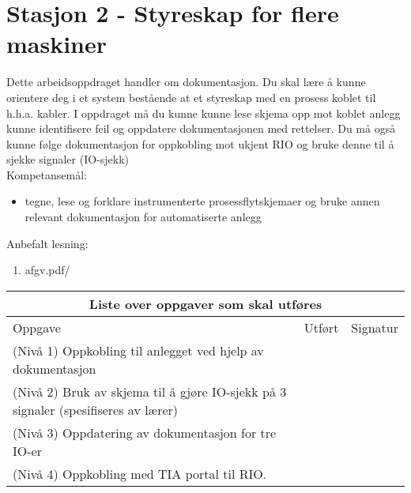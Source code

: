 
\noindent
\section*{Stasjon 2 - Styreskap for flere maskiner}

\vskip 5pt
Dette arbeidsoppdraget handler om dokumentasjon. Du skal lære å kunne orientere deg i et system bestående at et styreskap med en prosess koblet til h.h.a. kabler. I oppdraget må du kunne kunne lese skjema opp mot koblet anlegg kunne identifisere feil og oppdatere dokumentasjonen med rettelser. Du må også kunne følge dokumentasjon for oppkobling mot ukjent RIO og bruke denne til å sjekke signaler (IO-sjekk)\\

\vskip 5pt 
Kompetansemål:
\begin{itemize}[noitemsep]

	\item tegne, lese og forklare instrumenterte prosessflytskjemaer og bruke annen relevant dokumentasjon for automatiserte anlegg
\end{itemize}

Anbefalt lesning:

\begin{enumerate}
	\item afgv.pdf/ 
\end{enumerate}


\begin{center}
\begin{tabular}{ | m{10cm} | m{1cm}| m{2cm} | } 
\hline
\multicolumn{3}{|c|}{Liste over oppgaver som skal utføres} \\
	\hline
	Oppgave	& Utført & Signatur \\ 
	\hline
	\cellcolor{green!60}(Nivå 1) Oppkobling til anlegget ved hjelp av dokumentasjon	& & \\ 
	\hline
	\cellcolor{yellow!60}(Nivå 2) Bruk av skjema til å gjøre IO-sjekk på 3 signaler (spesifiseres av lærer)
	& & \\ 
	\hline
	\cellcolor{orange!60}(Nivå 3) Oppdatering av dokumentasjon for tre IO-er
	& & \\ 
	\hline
	\cellcolor{red!60}(Nivå 4) Oppkobling med TIA portal til RIO. 
	& & \\ 
	\hline
\end{tabular}
\end{center}

